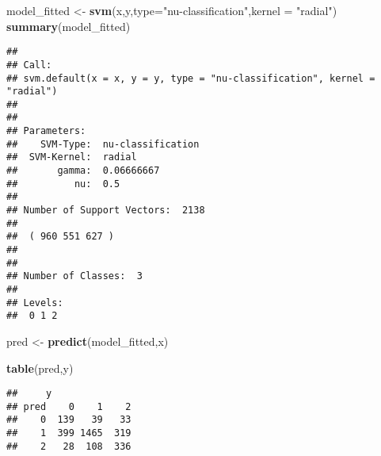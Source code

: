 \documentclass[]{article}
\newenvironment{Shaded}{\begin{snugshade}}{\end{snugshade}}
\newcommand{\KeywordTok}[1]{\textcolor[rgb]{0.13,0.29,0.53}{\textbf{{#1}}}}
\newcommand{\DataTypeTok}[1]{\textcolor[rgb]{0.13,0.29,0.53}{{#1}}}
\newcommand{\StringTok}[1]{\textcolor[rgb]{0.31,0.60,0.02}{{#1}}}
\newcommand{\NormalTok}[1]{{#1}}
\begin{document}
\begin{Shaded}
\begin{Highlighting}[]
\NormalTok{model_fitted <-}\StringTok{ }\KeywordTok{svm}\NormalTok{(x,y,}\DataTypeTok{type=}\StringTok{"nu-classification"}\NormalTok{,}\DataTypeTok{kernel =} \StringTok{"radial"}\NormalTok{)}
\KeywordTok{summary}\NormalTok{(model_fitted)}
\end{Highlighting}
\end{Shaded}

\begin{verbatim}
## 
## Call:
## svm.default(x = x, y = y, type = "nu-classification", kernel = "radial")
## 
## 
## Parameters:
##    SVM-Type:  nu-classification 
##  SVM-Kernel:  radial 
##       gamma:  0.06666667 
##          nu:  0.5 
## 
## Number of Support Vectors:  2138
## 
##  ( 960 551 627 )
## 
## 
## Number of Classes:  3 
## 
## Levels: 
##  0 1 2
\end{verbatim}

\begin{Shaded}
\begin{Highlighting}[]
\NormalTok{pred <-}\StringTok{ }\KeywordTok{predict}\NormalTok{(model_fitted,x)}
\end{Highlighting}
\end{Shaded}

\begin{Shaded}
\begin{Highlighting}[]
\KeywordTok{table}\NormalTok{(pred,y)}
\end{Highlighting}
\end{Shaded}

\begin{verbatim}
##     y
## pred    0    1    2
##    0  139   39   33
##    1  399 1465  319
##    2   28  108  336
\end{verbatim}
\end{document}
